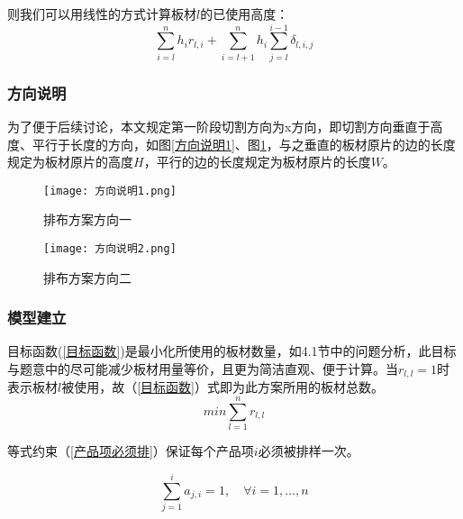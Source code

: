 \documentclass[bwprint]{gmcmthesis}
\begin{document}
则我们可以用线性的方式计算板材$l$的已使用高度：
\begin{equation}
\sum_{i=l}^{n} h_i r_{l,i}+\sum_{i=l+1}^{n} h_i \sum_{j=l}^{i-1} \delta_{l,i,j}
\end{equation}

\subsubsection{方向说明}
为了便于后续讨论，本文规定第一阶段切割方向为x方向，即切割方向垂直于高度、平行于长度的方向，如图\ref{方向说明1}、图\ref{方向说明2}，与之垂直的板材原片的边的长度规定为板材原片的高度$H$，平行的边的长度规定为板材原片的长度$W$。
\begin{figure}[!htbp]
    \centering
    \begin{minipage}{0.48\linewidth}
        \centering
        \texttt{[image: 方向说明1.png]}
        \caption{排布方案方向一}\label{方向说明1}
    \end{minipage}
    \begin{minipage}{0.48\linewidth}
        \centering
        \texttt{[image: 方向说明2.png]}
        \caption{排布方案方向二}\label{方向说明2}
    \end{minipage}
\end{figure}


\subsubsection{模型建立}



目标函数(\ref{目标函数})是最小化所使用的板材数量，如4.1节中的问题分析，此目标与题意中的尽可能减少板材用量等价，且更为简洁直观、便于计算。当$ r_{l,l}=1 $时表示板材$l$被使用，故（\ref{目标函数}）式即为此方案所用的板材总数。
\begin{equation}
    min \sum_{l=1}^{n}  r_{l,l} \label{目标函数}
 \end{equation}


等式约束（\ref{产品项必须排}）保证每个产品项$i$必须被排样一次。

\begin{equation}
    \sum_{j=1}^{i}  a_{j,i} =1,\quad \forall i=1,...,n \label{产品项必须排}
\end{equation}
\end{document}
